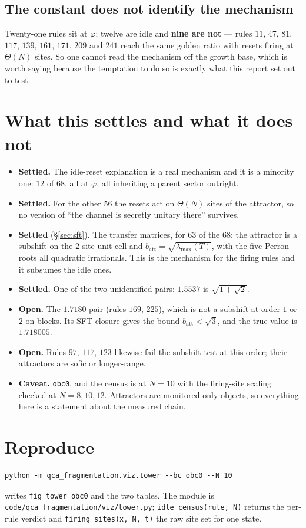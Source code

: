 \documentclass[11pt]{article}
\newcommand{\rt}[1]{\texttt{#1}}
\newcommand{\fn}[1]{\texttt{#1}}
\newcommand{\att}{\mathrm{att}}
\begin{document}
\subsection{The constant does not identify the mechanism}

Twenty-one rules sit at $\varphi$; twelve are idle and \textbf{nine are not}
--- rules $11$, $47$, $81$, $117$, $139$, $161$, $171$, $209$ and $241$ reach
the same golden ratio with resets firing at $\Theta(N)$ sites. So one cannot
read the mechanism off the growth base, which is worth saying because the
temptation to do so is exactly what this report set out to test.

\section{What this settles and what it does not}

\begin{itemize}
\item \textbf{Settled.} The idle-reset explanation is a real mechanism and it is
  a minority one: $12$ of $68$, all at $\varphi$, all inheriting a parent sector
  outright.
\item \textbf{Settled.} For the other $56$ the resets act on $\Theta(N)$ sites of
  the attractor, so no version of ``the channel is secretly unitary there''
  survives.
\item \textbf{Settled} (\S\ref{sec:sft}). The transfer matrices, for $63$ of
  the $68$: the attractor is a subshift on the $2$-site unit cell and
  $b_\att=\sqrt{\lambda_{\max}(T)}$, with the five Perron roots all quadratic
  irrationals. This is the mechanism for the firing rules and it subsumes the
  idle ones.
\item \textbf{Settled.} One of the two unidentified pairs:
  $1.5537$ is $\sqrt{1+\sqrt2}$.
\item \textbf{Open.} The $1.7180$ pair (rules $169$, $225$), which is not a
  subshift at order $1$ or $2$ on blocks. Its SFT closure gives the bound
  $b_\att<\sqrt3$, and the true value is $1.718005$.
\item \textbf{Open.} Rules $97$, $117$, $123$ likewise fail the subshift test
  at this order; their attractors are sofic or longer-range.
\item \textbf{Caveat.} \rt{obc0}, and the census is at $N=10$ with the
  firing-site scaling checked at $N=8,10,12$. Attractors are monitored-only
  objects, so everything here is a statement about the measured chain.
\end{itemize}

\section*{Reproduce}

\begin{verbatim}
python -m qca_fragmentation.viz.tower --bc obc0 --N 10
\end{verbatim}

\noindent writes \fn{fig\_tower\_obc0} and the two tables. The module is
\fn{code/qca\_fragmentation/viz/tower.py}; \fn{idle\_census(rule, N)} returns the
per-rule verdict and \fn{firing\_sites(x, N, t)} the raw site set for one state.
\end{document}
